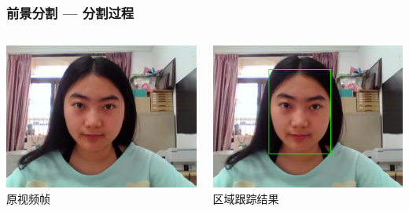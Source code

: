 \documentclass[xcolor=svgnames,serif,table]{beamer}
\begin{document}
\begin{frame}
  \frametitle{前景分割 --- 分割过程}
  \scriptsize
  \centering
  \begin{columns}
    \raggedleft
    \begin{minipage}{.7\linewidth}
      \centering
      \includegraphics[width=\textwidth]{grabcut-original.png}\\
      原视频帧
    \end{minipage}
    \begin{minipage}{0.7\linewidth}
      \centering
      \includegraphics[width=\textwidth]{grabcut-track.png}\\
      区域跟踪结果
    \end{minipage}
  \end{columns}


\end{frame}
\end{document}
